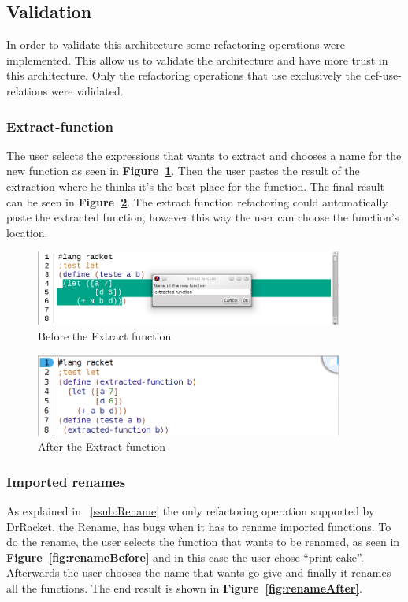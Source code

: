 \subsection{Validation}
In order to validate this architecture some refactoring operations were implemented. 
This allow us to validate the architecture and have more trust in this architecture.
Only the refactoring operations that use exclusively the def-use-relations were validated.

\subsubsection{Extract-function}
The user selects the expressions that wants to extract and chooses a name for the new function as seen in {\bf Figure~\ref{fig:extractBefore}}.
Then the user pastes the result of the extraction where he thinks it's the best place for the function. 
The final result can be seen in {\bf Figure~\ref{fig:extractAfter}}.
The extract function refactoring could automatically paste the extracted function, however this way the user can choose the function's location.
\begin{figure}[htbp]
	\centering
	\includegraphics[width=0.9\textwidth]{img/extractV2-1.png}
	\caption{Before the Extract function}
	\label{fig:extractBefore}
\end{figure}

\begin{figure}[htbp]
	\centering
	\includegraphics[width=0.9\textwidth]{img/extractV2-2.png}
	\caption{After the Extract function}
	\label{fig:extractAfter}
\end{figure}

\subsubsection{Imported renames}
As explained in ~\ref{ssub:Rename} the only refactoring operation supported by DrRacket, the Rename, has bugs when it has to rename imported functions.
To do the rename, the user selects the function that wants to be renamed, as seen in {\bf Figure~\ref{fig:renameBefore}} and in this case the user chose ``print-cake''.
Afterwards the user chooses the name that wants go give and finally it renames all the functions. 
The end result is shown in {\bf Figure~\ref{fig:renameAfter}}.

